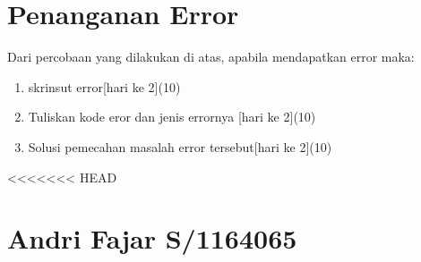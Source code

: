 \section{Penanganan Error}
Dari percobaan yang dilakukan di atas, apabila mendapatkan error maka:

\begin{enumerate}
	\item
	skrinsut error[hari ke 2](10)
	\item
Tuliskan kode eror dan jenis errornya [hari ke 2](10)
	\item
Solusi pemecahan masalah error tersebut[hari ke 2](10)

\end{enumerate}

<<<<<<< HEAD
\section{Andri Fajar S/1164065}
